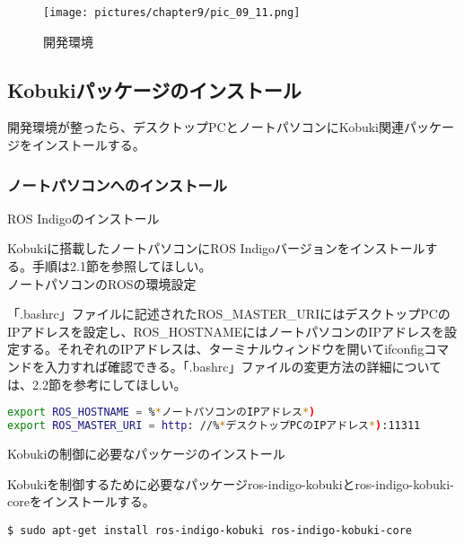 \begin{figure}[htp]
  \centering
  \texttt{[image: pictures/chapter9/pic\_09\_11.png]}
  \caption{開発環境}
\end{figure}

\subsection{Kobukiパッケージのインストール}

開発環境が整ったら、デスクトップPCとノートパソコンにKobuki関連パッケージをインストールする。

\subsubsection{ノートパソコンへのインストール}

\setcounter{num}{0}

\circled{\thenum} ROS Indigoのインストール

Kobukiに搭載したノートパソコンにROS Indigoバージョンをインストールする。手順は2.1節を参照してほしい。\\

\circled{\thenum} ノートパソコンのROSの環境設定

「.bashrc」ファイルに記述されたROS\_MASTER\_URIにはデスクトップPCのIPアドレスを設定し、ROS\_HOSTNAMEにはノートパソコンのIPアドレスを設定する。それぞれのIPアドレスは、ターミナルウィンドウを開いてifconfigコマンドを入力すれば確認できる。「.bashrc」ファイルの変更方法の詳細については、2.2節を参考にしてほしい。\\

\begin{lstlisting}[language=bash]
export ROS_HOSTNAME = %*ノートパソコンのIPアドレス*)
export ROS_MASTER_URI = http: //%*デスクトップPCのIPアドレス*):11311
\end{lstlisting}

\circled{\thenum} Kobukiの制御に必要なパッケージのインストール

Kobukiを制御するために必要なパッケージros-indigo-kobukiとros-indigo-kobuki-coreをインストールする。\\

\begin{lstlisting}[language=ROS]
$ sudo apt-get install ros-indigo-kobuki ros-indigo-kobuki-core
\end{lstlisting}

